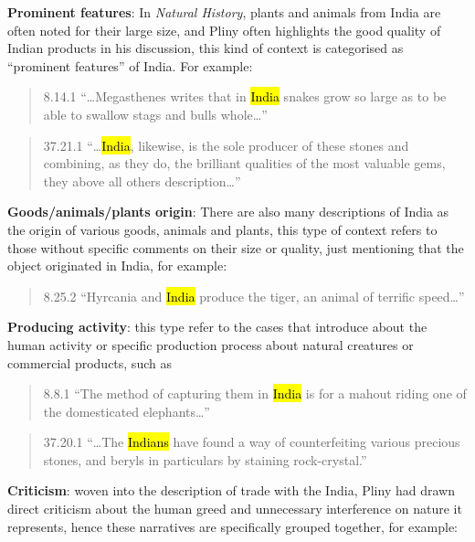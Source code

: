 \documentclass[
  12pt,
]{article}
\begin{document}
\textbf{Prominent features}: In \emph{Natural History}, plants and
animals from India are often noted for their large size, and Pliny often
highlights the good quality of Indian products in his discussion, this
kind of context is categorised as ``prominent features'' of India. For
example:

\begin{quote}
8.14.1 ``\ldots Megasthenes writes that in \hl{India} snakes grow so
large as to be able to swallow stags and bulls whole\ldots{}''
\end{quote}

\begin{quote}
37.21.1 ``\ldots{}\hl{India}, likewise, is the sole producer of these
stones and combining, as they do, the brilliant qualities of the most
valuable gems, they above all others description\ldots{}''
\end{quote}

\textbf{Goods/animals/plants origin}: There are also many descriptions
of India as the origin of various goods, animals and plants, this type
of context refers to those without specific comments on their size or
quality, just mentioning that the object originated in India, for
example:

\begin{quote}
8.25.2 ``Hyrcania and \hl{India} produce the tiger, an animal of
terrific speed\ldots{}''
\end{quote}

\textbf{Producing activity}: this type refer to the cases that introduce
about the human activity or specific production process about natural
creatures or commercial products, such as

\begin{quote}
8.8.1 ``The method of capturing them in \hl{India} is for a mahout
riding one of the domesticated elephants\ldots{}''
\end{quote}

\begin{quote}
37.20.1 ``\ldots The \hl{Indians} have found a way of counterfeiting
various precious stones, and beryls in particulars by staining
rock-crystal.''
\end{quote}

\textbf{Criticism}: woven into the description of trade with the India,
Pliny had drawn direct criticism about the human greed and unnecessary
interference on nature it represents, hence these narratives are
specifically grouped together, for example:
\end{document}

